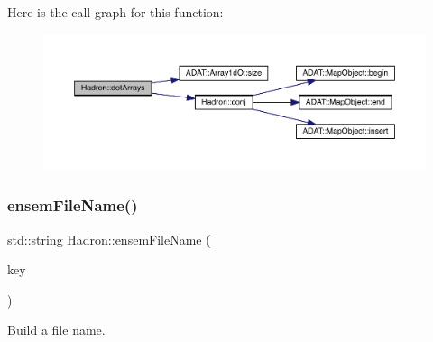 Here is the call graph for this function\+:
\nopagebreak
\begin{figure}[H]
\begin{center}
\leavevmode
\includegraphics[width=350pt]{d1/daf/namespaceHadron_aad081d14cd95160e164751fe86cff3af_cgraph}
\end{center}
\end{figure}
\mbox{\label{namespaceHadron_ae52edd7538c484e9f1c59f65a1d010ca}} 
\subsubsection{\texorpdfstring{ensemFileName()}{ensemFileName()}\hspace{0.1cm}{\footnotesize\ttfamily [1/12]}}
{\footnotesize\ttfamily std\+::string Hadron\+::ensem\+File\+Name (\begin{DoxyParamCaption}\item[{const \mbox{\hyperlink{structFF_1_1DiscoKeyOperator__t}{F\+F\+::\+Disco\+Key\+Operator\+\_\+t}} \&}]{key }\end{DoxyParamCaption})}



Build a file name. 

